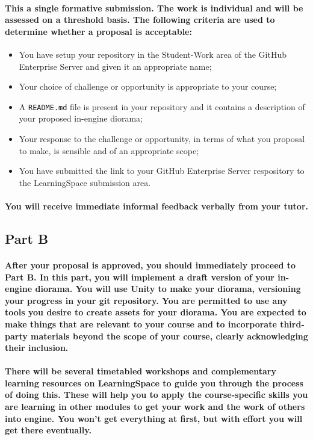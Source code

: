 \documentclass{../../fal_assignment}
\begin{document}
\paragraph{This a \textbf{single formative submission}. The work is \textbf{individual} and will be assessed on a \textbf{threshold} basis. The following criteria are used to determine whether a proposal is acceptable:}

\begin{itemize}
	\item You have setup your repository in the Student-Work area of the GitHub Enterprise Server and given it an appropriate name;
	\item Your choice of challenge or opportunity is appropriate to your course;
	\item A \texttt{README.md} file is present in your repository and it contains a description of your proposed in-engine diorama;
	\item Your response to the challenge or opportunity, in terms of what you proposal to make, is sensible and of an appropriate scope;
	\item You have submitted the link to your GitHub Enterprise Server respository to the LearningSpace submission area.
\end{itemize}

\paragraph{You will receive immediate \textbf{informal feedback} verbally from your \textbf{tutor}.}

\subsection*{Part B}

\paragraph{After your proposal is approved, you should immediately proceed to Part B. In this part, you will implement a draft version of your in-engine diorama. You will use Unity to make your diorama, versioning your progress in your git repository. You are permitted to use any tools you desire to create assets for your diorama. You are expected to make things that are relevant to your course and to incorporate third-party materials beyond the scope of your course, clearly acknowledging their inclusion.}

\paragraph{There will be several timetabled workshops and complementary learning resources on LearningSpace to guide you through the process of doing this. These will help you to apply the course-specific skills you are learning in other modules to get your work and the work of others into engine. You won't get everything at first, but with effort you will get there eventually.}
\end{document}
